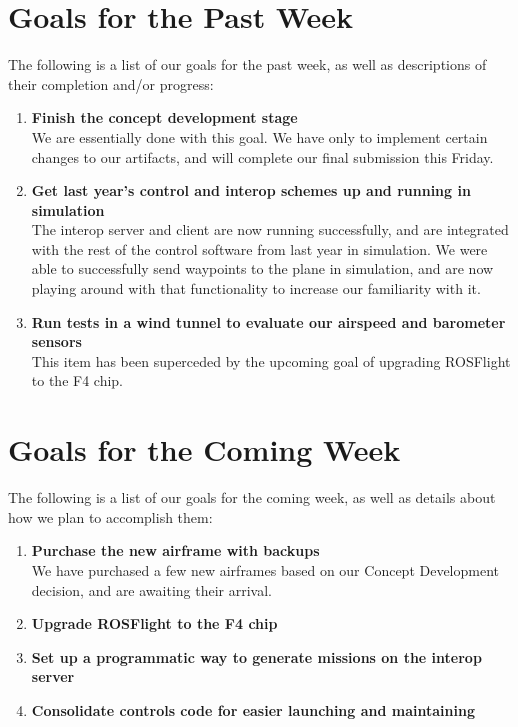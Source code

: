 \documentclass[]{../auvsi_doc}
\begin{document}
\section{Goals for the Past Week}

The following is a list of our goals for the past week, as well as descriptions of their completion and/or progress:

\begin{enumerate}
\item \textbf{Finish the concept development stage}\\
We are essentially done with this goal. We have only to implement certain changes to our artifacts, and will complete our final submission this Friday.
\item \textbf{Get last year's control and interop schemes up and running in simulation}\\
The interop server and client are now running successfully, and are integrated with the rest of the control software from last year in simulation. We were able to successfully send waypoints to the plane in simulation, and are now playing around with that functionality to increase our familiarity with it.
\item \textbf{Run tests in a wind tunnel to evaluate our airspeed and barometer sensors}\\
This item has been superceded by the upcoming goal of upgrading ROSFlight to the F4 chip.
\end{enumerate}

\section{Goals for the Coming Week}

The following is a list of our goals for the coming week, as well as details about how we plan to accomplish them:

\begin{enumerate}
\item \textbf{Purchase the new airframe with backups}\\
We have purchased a few new airframes based on our Concept Development decision, and are awaiting their arrival.
\item \textbf{Upgrade ROSFlight to the F4 chip}
\item \textbf{Set up a programmatic way to generate missions on the interop server}
\item \textbf{Consolidate controls code for easier launching and maintaining}
\end{enumerate}
\end{document}
